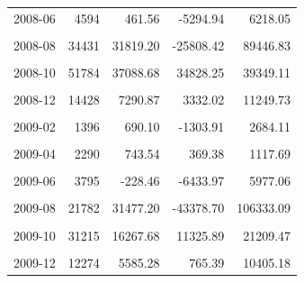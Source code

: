 \begin{longtable}[t]{crrrr}
2008-06 & 4594 & 461.56 & -5294.94 & 6218.05\\
\cellcolor{gray!10}{2008-07} & \cellcolor{gray!10}{14029} & \cellcolor{gray!10}{5558.74} & \cellcolor{gray!10}{-876.93} & \cellcolor{gray!10}{11994.41}\\
2008-08 & 34431 & 31819.20 & -25808.42 & 89446.83\\
\cellcolor{gray!10}{2008-09} & \cellcolor{gray!10}{50671} & \cellcolor{gray!10}{26791.80} & \cellcolor{gray!10}{-5228.97} & \cellcolor{gray!10}{58812.56}\\
2008-10 & 51784 & 37088.68 & 34828.25 & 39349.11\\
\cellcolor{gray!10}{2008-11} & \cellcolor{gray!10}{30724} & \cellcolor{gray!10}{19389.36} & \cellcolor{gray!10}{9566.38} & \cellcolor{gray!10}{29212.33}\\
2008-12 & 14428 & 7290.87 & 3332.02 & 11249.73\\
\cellcolor{gray!10}{2009-01} & \cellcolor{gray!10}{3874} & \cellcolor{gray!10}{1709.39} & \cellcolor{gray!10}{731.50} & \cellcolor{gray!10}{2687.27}\\
2009-02 & 1396 & 690.10 & -1303.91 & 2684.11\\
\cellcolor{gray!10}{2009-03} & \cellcolor{gray!10}{2002} & \cellcolor{gray!10}{244.82} & \cellcolor{gray!10}{-880.06} & \cellcolor{gray!10}{1369.70}\\
2009-04 & 2290 & 743.54 & 369.38 & 1117.69\\
\cellcolor{gray!10}{2009-05} & \cellcolor{gray!10}{3138} & \cellcolor{gray!10}{533.51} & \cellcolor{gray!10}{-1043.66} & \cellcolor{gray!10}{2110.67}\\
2009-06 & 3795 & -228.46 & -6433.97 & 5977.06\\
\cellcolor{gray!10}{2009-07} & \cellcolor{gray!10}{7824} & \cellcolor{gray!10}{1240.71} & \cellcolor{gray!10}{-8224.03} & \cellcolor{gray!10}{10705.44}\\
2009-08 & 21782 & 31477.20 & -43378.70 & 106333.09\\
\cellcolor{gray!10}{2009-09} & \cellcolor{gray!10}{36116} & \cellcolor{gray!10}{17464.61} & \cellcolor{gray!10}{-23602.12} & \cellcolor{gray!10}{58531.33}\\
2009-10 & 31215 & 16267.68 & 11325.89 & 21209.47\\
\cellcolor{gray!10}{2009-11} & \cellcolor{gray!10}{29396} & \cellcolor{gray!10}{18233.06} & \cellcolor{gray!10}{7219.51} & \cellcolor{gray!10}{29246.62}\\
2009-12 & 12274 & 5585.28 & 765.39 & 10405.18\\

\end{longtable}

